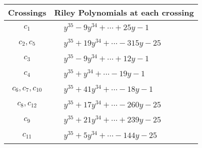 \documentclass[1p]{elsarticle_modified}
\theoremstyle{definition}
\begin{document}
\begin{tabular}{m{50pt}|m{274pt}}
Crossings & \hspace{64pt}Riley Polynomials at each crossing \\
\hline $$\begin{aligned}c_{1}\end{aligned}$$&$\begin{aligned}
&y^{35}-9 y^{34}+\cdots+25 y-1
\end{aligned}$\\
\hline $$\begin{aligned}c_{2},c_{5}\end{aligned}$$&$\begin{aligned}
&y^{35}+19 y^{34}+\cdots-315 y-25
\end{aligned}$\\
\hline $$\begin{aligned}c_{3}\end{aligned}$$&$\begin{aligned}
&y^{35}-9 y^{34}+\cdots+12 y-1
\end{aligned}$\\
\hline $$\begin{aligned}c_{4}\end{aligned}$$&$\begin{aligned}
&y^{35}+y^{34}+\cdots-19 y-1
\end{aligned}$\\
\hline $$\begin{aligned}c_{6},c_{7},c_{10}\end{aligned}$$&$\begin{aligned}
&y^{35}+41 y^{34}+\cdots-18 y-1
\end{aligned}$\\
\hline $$\begin{aligned}c_{8},c_{12}\end{aligned}$$&$\begin{aligned}
&y^{35}+17 y^{34}+\cdots-260 y-25
\end{aligned}$\\
\hline $$\begin{aligned}c_{9}\end{aligned}$$&$\begin{aligned}
&y^{35}+21 y^{34}+\cdots+239 y-25
\end{aligned}$\\
\hline $$\begin{aligned}c_{11}\end{aligned}$$&$\begin{aligned}
&y^{35}+5 y^{34}+\cdots-144 y-25
\end{aligned}$\\
\hline
\end{tabular}\\~\\
\end{document}
